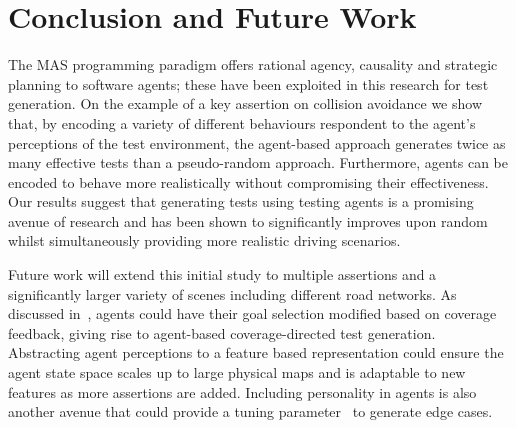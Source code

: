 \documentclass[letterpaper, 10 pt, journal, twoside]{IEEEtran}
\begin{document}
\section{Conclusion and Future Work}\label{s:conclusion}
The MAS programming paradigm offers rational agency, causality and strategic planning to software agents; these have been exploited in this research for test generation. 
%
On the example of a key assertion on collision avoidance we show that, by encoding a variety of different behaviours respondent to the agent's perceptions of the test environment, the agent-based approach generates twice as many effective tests than a pseudo-random approach. Furthermore, agents can be encoded to behave more realistically without compromising their effectiveness. 
Our results suggest that generating tests using testing agents is a promising avenue of research and has been shown to significantly improves upon random whilst simultaneously providing more realistic driving scenarios.

Future work will extend this initial study to multiple assertions and a significantly larger variety of scenes including different road networks. 
As discussed in~\cite{Eder2007}, agents could have their goal selection modified based on coverage feedback, giving rise to  agent-based coverage-directed test generation. 
%
%
Abstracting agent perceptions to a feature based representation could ensure the agent state space scales up to large physical maps and is adaptable to new features as more assertions are added.
Including personality in agents is also another avenue that could provide a tuning parameter~\cite{Zoumpoulaki2010} to generate edge cases. 
\end{document}
